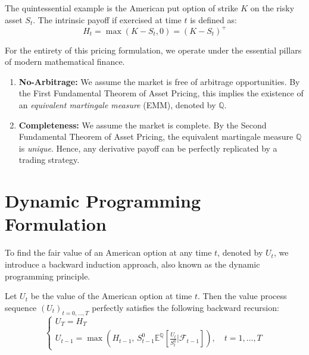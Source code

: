 \begin{example}
The quintessential example is the American put option of strike $K$ on the risky asset $S_t$. The intrinsic payoff if exercised at time $t$ is defined as:
$$
H_t = \max(K - S_t, 0) = (K - S_t)^+
$$
\end{example}

For the entirety of this pricing formulation, we operate under the essential pillars of modern mathematical finance.
\begin{enumerate}
    \item \textbf{No-Arbitrage:} We assume the market is free of arbitrage opportunities. By the First Fundamental Theorem of Asset Pricing, this implies the existence of an \textit{equivalent martingale measure} (EMM), denoted by $\mathbb{Q}$.
    \item \textbf{Completeness:} We assume the market is complete. By the Second Fundamental Theorem of Asset Pricing, the equivalent martingale measure $\mathbb{Q}$ is \textit{unique}. Hence, any derivative payoff can be perfectly replicated by a trading strategy.
\end{enumerate}

\section{Dynamic Programming Formulation}

To find the fair value of an American option at any time $t$, denoted by $U_t$, we introduce a backward induction approach, also known as the dynamic programming principle.

\begin{proposition}
Let $U_t$ be the value of the American option at time $t$. Then the value process sequence $(U_t)_{t=0, \dots, T}$ perfectly satisfies the following backward recursion:
$$
\begin{cases}
U_T = H_T \\
U_{t-1} = \max\left( H_{t-1}, \, S_{t-1}^0 \mathbb{E}^{\mathbb{Q}}\left[ \frac{U_t}{S_t^0} \Big| \mathcal{F}_{t-1} \right] \right), \quad t = 1, \dots, T
\end{cases}
$$
\end{proposition}

